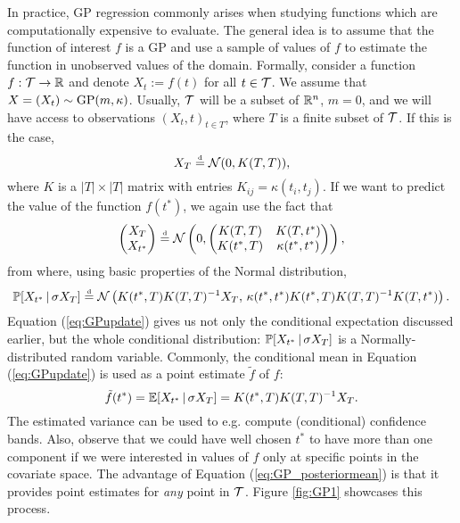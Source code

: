In practice, GP regression commonly arises when studying functions which are computationally expensive to evaluate. The general idea is to assume that the function of interest $f$ is a GP and use a sample of values of $f$ to estimate the function in unobserved values of the domain. Formally, consider a function $f: \mathcal{T} \to \mathbb{R}$ and denote $X_t := f(t)$ for all $t \in \mathcal{T}$. We assume that $X = (X_t) \sim \mathrm{GP} (m, \kappa)$. Usually, $\mathcal{T}$ will be a subset of $\mathbb{R}^n$, $m = 0$, and we will have access to observations $(X_t, t)_{t \in T}$, where $T$ is a finite subset of $\mathcal{T}$. If this is the case,
\begin{equation} \label{eq:GP_noise_free}
	X_T \stackrel{\text{\rm\tiny d}}{=} \mathcal{N} (0, K(T, T)),
\end{equation}
where $K$ is a $|T| \times |T|$ matrix with entries $K_{ij} = \kappa(t_i, t_j)$. If we want to predict the value of the function $f(t^{*})$, we again use the fact that
\begin{equation*}
	\begin{pmatrix} X_T \\ X_{t^{*}} \end{pmatrix} \stackrel{\text{\rm\tiny d}}{=} \mathcal{N} \left( 0, \begin{pmatrix} K(T, T) & K(T, t^{*}) \\ K(t^{*}, T) & \kappa(t^{*}, t^{*}) \end{pmatrix} \right),
\end{equation*}
from where, using basic properties of the Normal distribution,
\begin{equation} \label{eq:GPupdate}
	\mathbb{P} [X_{t^{*}} \,| \, \sigma X_T ] \stackrel{\text{\rm\tiny d}}{=} \mathcal{N} \left( K(t^{*}, T) K(T, T)^{-1} X_T, \, \kappa(t^{*}, t^{*}) K(t^{*}, T) K(T, T)^{-1} K(T, t^{*})  \right).
\end{equation}
Equation (\ref{eq:GPupdate}) gives us not only the conditional expectation discussed earlier, but the whole conditional distribution: $\mathbb{P} [X_{t^{*}} \,| \, \sigma X_T ]$ is a Normally-distributed random variable. Commonly, the conditional mean in Equation (\ref{eq:GPupdate}) is used as a point estimate $\tilde{f}$ of $f$:
\begin{equation} \label{eq:GP_posteriormean}
	\tilde{f} (t^{*}) = \mathbb{E} [ X_{t^{*}} \, | \, \sigma X_T ] = K(t^{*}, T) K(T, T)^{-1} X_T.
\end{equation}
The estimated variance can be used to e.g. compute (conditional) confidence bands. Also, observe that we could have well chosen $t^{*}$ to have more than one component if we were interested in values of $f$ only at specific points in the covariate space. The advantage of Equation (\ref{eq:GP_posteriormean}) is that it provides point estimates for \textit{any} point in $\mathcal{T}$. Figure \ref{fig:GP1} showcases this process. \\




